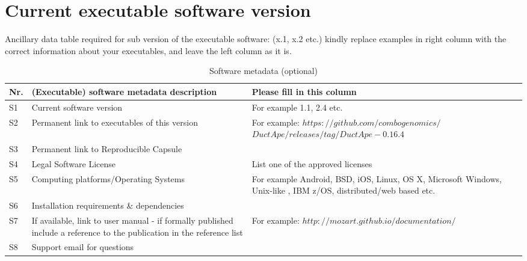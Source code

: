 \documentclass[preprint,12pt,letterpaper]{elsarticle}
\begin{document}
\section*{Current executable software version}

Ancillary data table required for sub version of the executable software: (x.1, x.2 etc.) kindly replace examples in right column with the correct information about your executables, and leave the left column as it is.

\begin{table}[!h]
\begin{tabular}{|l|p{6.5cm}|p{6.5cm}|}
\hline
\textbf{Nr.} & \textbf{(Executable) software metadata description} & \textbf{Please fill in this column} \\
\hline
S1 & Current software version & For example 1.1, 2.4 etc. \\
\hline
S2 & Permanent link to executables of this version  & For example: $https://github.com/combogenomics/$ $DuctApe/releases/tag/DuctApe-0.16.4$ \\
\hline
S3  & Permanent link to Reproducible Capsule & \\
\hline
S4 & Legal Software License & List one of the approved licenses \\
\hline
S5 & Computing platforms/Operating Systems & For example Android, BSD, iOS, Linux, OS X, Microsoft Windows, Unix-like , IBM z/OS, distributed/web based etc. \\
\hline
S6 & Installation requirements \& dependencies & \\
\hline
S7 & If available, link to user manual - if formally published include a reference to the publication in the reference list & For example: $http://mozart.github.io/documentation/$ \\
\hline
S8 & Support email for questions & \\
\hline
\end{tabular}
\caption{Software metadata (optional)}
\end{table}
\end{document}

